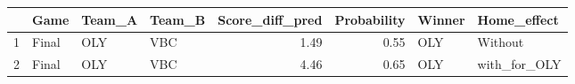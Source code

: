 \begin{table}[ht]
\centering
\begin{tabular}{rlllrrll}
  \hline
 & Game & Team\_A & Team\_B & Score\_diff\_pred & Probability & Winner & Home\_effect \\ 
  \hline
1 & Final & OLY & VBC & 1.49 & 0.55 & OLY & Without \\ 
  2 & Final & OLY & VBC & 4.46 & 0.65 & OLY & with\_for\_OLY \\ 
   \hline
\end{tabular}
\end{table}
